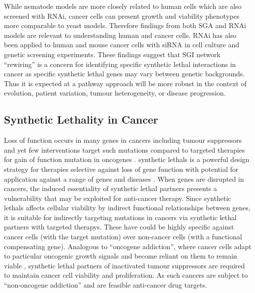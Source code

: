 While nematode models are more closely related to human cells which are also screened with \gls{RNAi}, cancer cells can present growth and viability phenotypes more comparable to yeast models. Therefore findings from both \gls{SGA} and \gls{RNAi} models are relevant to understanding human and cancer cells. \gls{RNAi} has also been applied to human and mouse cancer cells with \acrfull{siRNA} in cell culture and genetic screening experiments. These findings suggest that \gls{SGI} network ``rewiring'' is a concern for identifying specific \gls{synthetic lethal} interactions in cancer as specific \gls{synthetic lethal} genes may vary between genetic backgrounds. Thus it is expected at a \gls{pathway} approach will be more robust in the context of evolution, patient variation, tumour heterogeneity, or disease progression.  

\subsection{Synthetic Lethality in Cancer}

Loss of function occurs in many genes in cancers including \glspl{tumour suppressor} and yet few interventions target such \glspl{mutation} compared to targeted therapies for gain of function \gls{mutation} in \glspl{oncogene} \citep{Kaelin2005}. \Glspl{synthetic lethal} is a powerful design strategy for therapies selective against loss of gene function with potential for application against a range of genes and diseases \citep{Kaelin2009, Fece2015}. When genes are disrupted in cancers, the \gls{induced essentiality} of \gls{synthetic lethal} partners presents a vulnerability that may be exploited for anti-cancer therapy. Since \glspl{synthetic lethal} affects cellular viability by indirect functional relationships between genes, it is suitable for indirectly targeting \glspl{mutation} in cancers via \gls{synthetic lethal} partners with \glspl{targeted therapy}. These have could be highly specific against cancer cells (with the target \gls{mutation}) over non-cancer cells (with a functional compensating gene). Analogous to ``\gls{oncogene addiction}'', where cancer cells adapt to particular oncogenic growth signals and become reliant on them to remain viable \citep{Luo2009, Weinstein2000}, \gls{synthetic lethal} partners of inactivated \glspl{tumour suppressor} are required to maintain cancer cell viability and proliferation. As such cancers are subject to ``\gls{non-oncogene addiction}'' and are feasible anti-cancer drug targets. 


